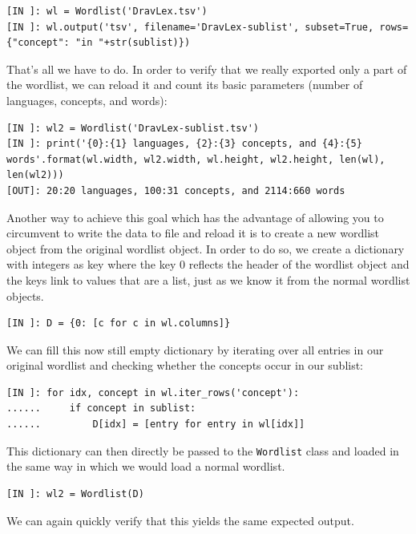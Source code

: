 \documentclass[
  a4paper,
  14pt,
  oneside,
  tablecaptionabove
]{scrbook}
\begin{document}
\begin{lstlisting}[basicstyle=\small]
[IN ]: wl = Wordlist('DravLex.tsv')
[IN ]: wl.output('tsv', filename='DravLex-sublist', subset=True, rows={"concept": "in "+str(sublist)})
\end{lstlisting}

That's all we have to do. In order to verify that we really exported
only a part of the wordlist, we can reload it and count its basic
parameters (number of languages, concepts, and words):

\begin{lstlisting}[basicstyle=\small]
[IN ]: wl2 = Wordlist('DravLex-sublist.tsv') 
[IN ]: print('{0}:{1} languages, {2}:{3} concepts, and {4}:{5} words'.format(wl.width, wl2.width, wl.height, wl2.height, len(wl), len(wl2))) 
[OUT]: 20:20 languages, 100:31 concepts, and 2114:660 words
\end{lstlisting}

Another way to achieve this goal which has the advantage of allowing you
to circumvent to write the data to file and reload it is to create a new
wordlist object from the original wordlist object. In order to do so, we
create a dictionary with integers as key where the key 0 reflects the
header of the wordlist object and the keys link to values that are a
list, just as we know it from the normal wordlist objects.

\begin{lstlisting}[basicstyle=\small]
[IN ]: D = {0: [c for c in wl.columns]}
\end{lstlisting}

We can fill this now still empty dictionary by iterating over all
entries in our original wordlist and checking whether the concepts occur
in our sublist:

\begin{lstlisting}[basicstyle=\small]
[IN ]: for idx, concept in wl.iter_rows('concept'):
......     if concept in sublist:
......         D[idx] = [entry for entry in wl[idx]] 
\end{lstlisting}

This dictionary can then directly be passed to the \lstinline!Wordlist!
class and loaded in the same way in which we would load a normal
wordlist.

\begin{lstlisting}[basicstyle=\small]
[IN ]: wl2 = Wordlist(D)
\end{lstlisting}

We can again quickly verify that this yields the same expected output.
\end{document}
